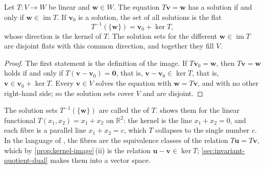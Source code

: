 \begin{proposition}
\label{prop:preimage-flat}
Let $T\colon V\to W$ be linear and $\mathbf w\in W$. The equation $T\mathbf v=\mathbf w$ has a solution if and only if $\mathbf w\in\operatorname{im}T$. If $\mathbf v_0$ is a solution, the set of all solutions is the flat
\[
T^{-1}(\{\mathbf w\})=\mathbf v_0+\ker T,
\]
whose direction is the kernel of $T$. The solution sets for the different $\mathbf w\in\operatorname{im}T$ are disjoint flats with this common direction, and together they fill $V$.
\end{proposition}

\begin{proof}
The first statement is the definition of the image. If $T\mathbf v_0=\mathbf w$, then $T\mathbf v=\mathbf w$ holds if and only if $T(\mathbf v-\mathbf v_0)=\mathbf 0$, that is, $\mathbf v-\mathbf v_0\in\ker T$, that is, $\mathbf v\in\mathbf v_0+\ker T$. Every $\mathbf v\in V$ solves the equation with $\mathbf w=T\mathbf v$, and with no other right-hand side; so the solution sets cover $V$ and are disjoint.
\end{proof}

The solution sets $T^{-1}(\{\mathbf w\})$ are called the  of $T$.  shows them for the linear functional $T(x_1,x_2)=x_1+x_2$ on $\mathbb R^2$: the kernel is the line $x_1+x_2=0$, and each fibre is a parallel line $x_1+x_2=c$, which $T$ collapses to the single number $c$. In the language of , the fibres are the equivalence classes of the relation $T\mathbf u=T\mathbf v$, which by \cref{prop:kernel-image}\,(ii) is the relation $\mathbf u-\mathbf v\in\ker T$; \cref{sec:invariant-quotient-dual} makes them into a vector space.


